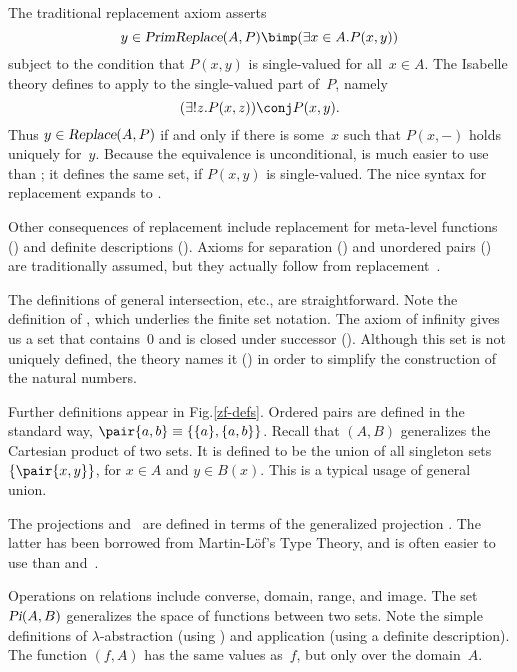 The traditional replacement axiom asserts
\[ y \in \isa{PrimReplace}(A,P) \bimp (\exists x\in A. P(x,y)) \]
subject to the condition that $P(x,y)$ is single-valued for all~$x\in A$.
The Isabelle theory defines  to apply
 to the single-valued part of~$P$, namely
\[ (\exists!z. P(x,z)) \conj P(x,y). \]
Thus $y\in \emph{\sl Replace}(A,P)$ if and only if there is some~$x$ such that
$P(x,-)$ holds uniquely for~$y$.  Because the equivalence is unconditional,
 is much easier to use than ; it defines the
same set, if $P(x,y)$ is single-valued.  The nice syntax for replacement
expands to .

Other consequences of replacement include replacement for 
meta-level functions
() and definite descriptions ().
Axioms for separation () and unordered pairs
() are traditionally assumed, but they actually follow
from replacement~\cite[pages 237--8]{suppes72}.

The definitions of general intersection, etc., are straightforward.  Note
the definition of , which underlies the finite set notation.
The axiom of infinity gives us a set that contains~0 and is closed under
successor ().  Although this set is not uniquely defined,
the theory names it () in order to simplify the
construction of the natural numbers.
                                             
Further definitions appear in Fig.\ts\ref{zf-defs}.  Ordered pairs are
defined in the standard way, $\pair{a,b}\equiv\{\{a\},\{a,b\}\}$.  Recall
that $(A,B)$ generalizes the Cartesian product of two
sets.  It is defined to be the union of all singleton sets
$\{\pair{x,y}\}$, for $x\in A$ and $y\in B(x)$.  This is a typical usage of
general union.

The projections  and~ are defined in terms of the
generalized projection .  The latter has been borrowed from
Martin-L\"of's Type Theory, and is often easier to use than 
and~.

Operations on relations include converse, domain, range, and image.  The
set $\emph{\sl Pi}(A,B)$ generalizes the space of functions between two sets.
Note the simple definitions of $\lambda$-abstraction (using
) and application (using a definite description).  The
function $(f,A)$ has the same values as~$f$, but only
over the domain~$A$.



